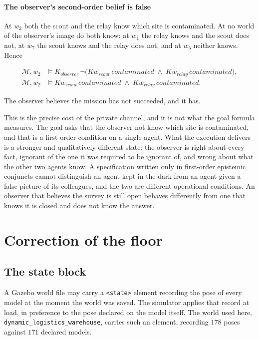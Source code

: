 \documentclass[11pt,a4paper]{article}
\theoremstyle{definition}
\newcommand{\Mod}{\mathcal{M}}
\newcommand{\Kop}[1]{K_{#1}}
\newcommand{\Kw}[1]{\mathit{Kw}_{#1}}
\newcommand{\code}[1]{\texttt{\small #1}}
\begin{document}
\paragraph{The observer's second-order belief is false} At $w_2$ both the scout
and the relay know which site is contaminated. At no world of the observer's
image do both know: at $w_1$ the relay knows and the scout does not, at $w_7$
the scout knows and the relay does not, and at $w_5$ neither knows. Hence

\begin{align*}
\Mod, w_2 &\models
  \Kop{\mathit{observer}}\, \neg\bigl(
  \Kw{\mathit{scout}}\,\mathit{contaminated} \;\wedge\;
  \Kw{\mathit{relay}}\,\mathit{contaminated} \bigr), \\[2pt]
\Mod, w_2 &\models
  \Kw{\mathit{scout}}\,\mathit{contaminated} \;\wedge\;
  \Kw{\mathit{relay}}\,\mathit{contaminated}.
\end{align*}

The observer believes the mission has not succeeded, and it has.

This is the precise cost of the private channel, and it is not what the goal
formula measures. The goal asks that the observer not know which site is
contaminated, and that is a first-order condition on a single agent. What the
execution delivers is a stronger and qualitatively different state: the
observer is right about every fact, ignorant of the one it was required to be
ignorant of, and wrong about what the other two agents know. A specification
written only in first-order epistemic conjuncts cannot distinguish an agent
kept in the dark from an agent given a false picture of its colleagues, and
the two are different operational conditions. An observer that believes the
survey is still open behaves differently from one that knows it is closed and
does not know the answer.

\section{Correction of the floor}
\label{sec:floor}

\subsection{The state block}

A Gazebo world file may carry a \code{<state>} element recording the pose of
every model at the moment the world was saved. The simulator applies that
record at load, in preference to the pose declared on the model itself. The
world used here, \code{dynamic\_logistics\_warehouse}, carries such an element,
recording $178$ poses against $171$ declared models.
\end{document}
